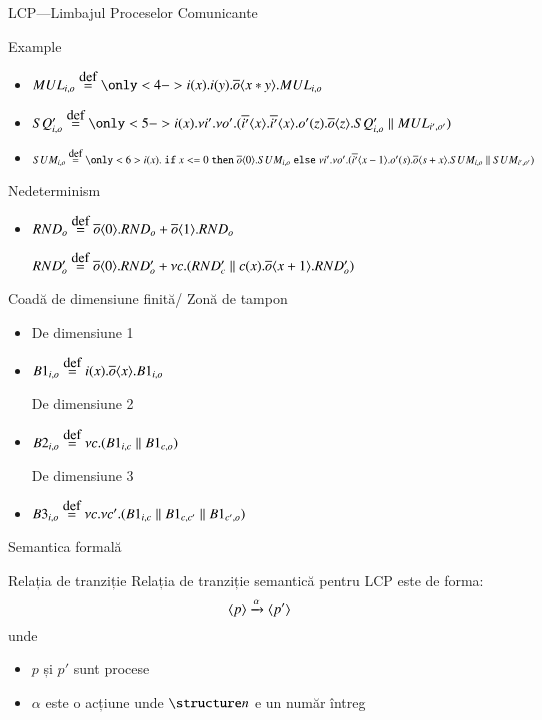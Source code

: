 \documentclass[xcolor=pdftex,romanian,colorlinks]{beamer}
\begin{document}
\begin{section}{LCP—Limbajul Proceselor Comunicante}
\begin{subsection}{Example}
\begin{frame}
\begin{itemize}
\vfill
\item<3-> $MUL_{i,o} \defeq \only<4->{i(x).i(y).\out{o}{ x*y} . MUL_{i,o}}$
\item<4-> $SQ'_{i,o} \defeq \only<5->{i(x).\nu i'.\nu o'.(\out{i'}{ x}.\out{i'}{ x}.o'(z).\out{o}{ z }.SQ'_{i,o} \parallel MUL_{i',o'} )}$

\vfill
\item<5-> $SUM_{i,o} \defeq \only<6>{i(x).\Sif x <= 0 \Sthen \out{o}{ 0 } . SUM_{i,o} \Selse \nu i'.\nu o'.(\out{i'}{ x-1 }.o'(s).\out{o}{ s + x } . SUM_{i,o} \parallel SUM_{i',o'})}$

\end{itemize}


\end{frame}

\begin{frame}{Nedeterminism}
\begin{itemize}
\item<2-> $RND_o \stackrel{\mbox{def}}{=} \overline{o}\langle{0}\rangle.RND_o + \overline{o}\langle{1}\rangle.RND_o$

 $RND'_o \stackrel{\mbox{def}}{=} \overline{o}\langle{0}\rangle.RND'_o + \nu c.(RND'_{c} \parallel c(x).\overline{o}\langle{x+1}\rangle.RND'_o)$
\end{itemize}


\end{frame}


\begin{frame}{Coadă de dimensiune finită/ Zonă de tampon}
\begin{itemize}
\item De dimensiune 1
\item<2-> $B1_{i,o} \stackrel{\mbox{def}}{=} i(x).\overline{o}\langle{x}\rangle.B1_{i,o}$

 De dimensiune 2
\item<4-> $B2_{i,o} \stackrel{\mbox{def}}{=} \nu c. (B1_{i,c} \parallel B1_{c,o})$

 De dimensiune 3
\item<6> $B3_{i,o} \stackrel{\mbox{def}}{=} \nu c.\nu c'. (B1_{i,c} \parallel B1_{c,c'} \parallel B1_{c',o})$

\end{itemize}


\end{frame}

\end{subsection}
\begin{subsection}{Semantica formală}

\begin{frame}{Relația de tranziție}
Relația de tranziție semantică pentru LCP este de forma:
\[{\langle{p}\rangle}\xrightarrow{\alpha}{\langle{p'}\rangle}\]
unde
\begin{itemize}
\item $p$ și $p'$ sunt procese
\item $\alpha$ este o acțiune
\alert{
\renewcommand{\syntaxKeyword}{}
\syntax[\structure{\alpha}]{\epsilon \Smid \Channel(\Int) \Smid \out{\Channel}{\Int}}{}
}
unde $\Int$ e un număr întreg
\end{itemize}
\end{frame}


\end{subsection}
\end{section}
\end{document}
